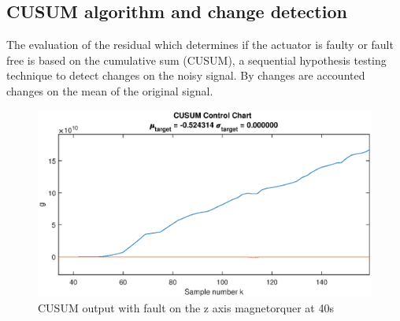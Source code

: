 \subsection{CUSUM algorithm and change detection} 
The evaluation of the residual which determines if the actuator is faulty or fault free is based on the cumulative sum (CUSUM), a sequential hypothesis testing technique to detect changes on the noisy signal. By changes are accounted changes on the mean of the original signal. 



  \begin{figure}[H]
  	\centering
  	\includegraphics[width=0.7\linewidth]{figures/cusum1}
  	\caption{CUSUM output with fault on the z axis magnetorquer at 40s }
  	\label{fig:cusum1}
  \end{figure}  